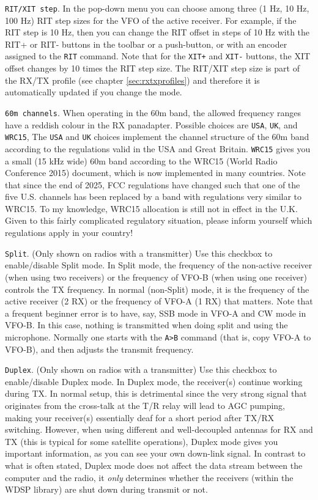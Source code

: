 \documentclass[12pt]{book}
\def\rett#1{\texttt{\color{red}#1}}
\def\bltt#1{\texttt{\color{blue}#1}}
\begin{document}
\rett{RIT/XIT step}. In the pop-down menu you can choose among three (1 Hz, 10 Hz, 100 Hz) RIT step sizes
for the VFO of the active receiver. For example, if the RIT step is 10 Hz, then you can change the RIT offset
in steps of 10 Hz with the RIT+ or RIT- buttons in the toolbar or a push-button, or with
an encoder assigned to the \bltt{RIT} command. Note that for the
\bltt{XIT+} and \bltt{XIT-} buttons, the XIT offset changes by 10 times the RIT step size. The RIT/XIT step
size is part of the RX/TX profile (see chapter \ref{sec:rxtxprofiles}) and therefore it is automatically updated
if you change the mode.

\rett{60m channels}. When operating in the 60m band, the allowed frequency ranges have a reddish
colour in the RX panadapter. Possible choices are \texttt{USA}, \texttt{UK}, and \texttt{WRC15},
The \texttt{USA} and \texttt{UK} choices implement the channel structure of the 60m
band according to the regulations valid in the USA and Great Britain. \texttt{WRC15} gives you a small (15 kHz
wide) 60m band according to the WRC15 (World Radio Conference 2015) document, which is now implemented in
many countries. Note that since the end of 2025, FCC regulations have changed such that one of the
five U.S. channels has been replaced by a band with regulations very similar to WRC15. To my knowledge,
WRC15 allocation is still not in effect in the U.K. Given to this fairly complicated regulatory
situation, please inform yourself which regulations apply in your country!

\rett{Split}. (Only shown on radios with a transmitter)
Use this checkbox to enable/disable Split mode. In Split mode, the frequency of
the non-active receiver (when using two receivers) or the frequency of VFO-B (when using one
receiver) controls the TX frequency. In normal (non-Split) mode, it is the frequency of
the active receiver (2 RX) or the frequency of VFO-A (1 RX) that matters.
Note that a frequent beginner error is to have, say,
SSB mode in VFO-A and CW mode in VFO-B. In this case, nothing is
transmitted when doing split and using the microphone. Normally one
starts with the \bltt{A>B} command (that is, copy VFO-A to VFO-B), and
then adjusts the transmit frequency.

\rett{Duplex}. (Only shown on radios with a transmitter)
Use this checkbox to enable/disable Duplex mode. In Duplex mode, the receiver(s)
continue working during TX. In normal setup, this is detrimental since the very strong
signal that originates from the cross-talk at the T/R relay will lead to AGC pumping,
making your receiver(s) essentially deaf for a short period after TX/RX switching.
However, when using different and well-decoupled antennas for RX and TX (this is typical
for some satellite operations), Duplex mode gives you important information, as you can
see your own down-link signal. In contrast to what is often stated, Duplex mode does not
affect the data stream between the computer and the radio, it \textit{only} determines
whether the receivers (within the WDSP library) are shut down during transmit or not.
\end{document}
